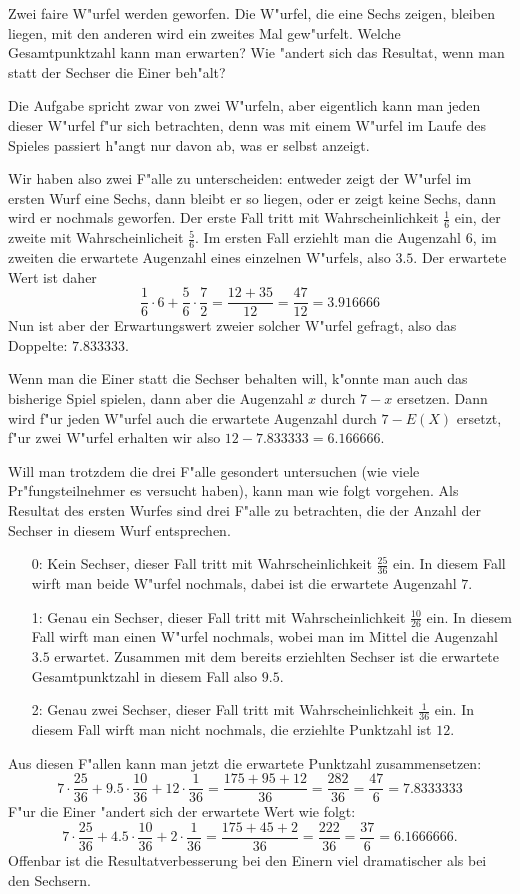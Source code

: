 Zwei faire W"urfel werden geworfen. Die W"urfel, die eine Sechs
zeigen, bleiben liegen, mit den anderen wird ein zweites Mal gew"urfelt.
Welche Gesamtpunktzahl kann man erwarten?
Wie "andert sich das Resultat, wenn man statt der Sechser die Einer
beh"alt?

\begin{loesung}
Die Aufgabe spricht zwar von zwei W"urfeln, aber eigentlich kann man
jeden dieser W"urfel f"ur sich betrachten, denn was mit einem W"urfel
im Laufe des Spieles passiert h"angt nur davon ab, was er selbst
anzeigt.

Wir haben also zwei F"alle zu unterscheiden: entweder zeigt der
W"urfel im ersten Wurf eine Sechs, dann bleibt er so liegen,
oder er zeigt keine Sechs, dann wird er nochmals geworfen.
Der erste Fall tritt mit Wahrscheinlichkeit $\frac16$ ein,
der zweite mit Wahrscheinlicheit $\frac56$. Im ersten Fall
erziehlt man die Augenzahl $6$, im zweiten die erwartete
Augenzahl eines einzelnen W"urfels, also $3.5$. Der erwartete
Wert ist daher
\[
\frac16\cdot 6 +\frac56\cdot\frac72=\frac{12+35}{12}=\frac{47}{12}=3.916666
\]
Nun ist aber der Erwartungswert zweier solcher W"urfel
gefragt, also das Doppelte: $7.833333$.

Wenn man die Einer statt die Sechser behalten will, k"onnte man
auch das bisherige Spiel spielen, dann aber die Augenzahl
$x$ durch $7-x$ ersetzen. Dann wird f"ur jeden W"urfel auch
die erwartete Augenzahl durch $7-E(X)$ ersetzt, f"ur zwei
W"urfel erhalten wir also $12-7.833333 = 6.166666$.

Will man trotzdem die drei F"alle gesondert untersuchen (wie
viele Pr"fungsteilnehmer es versucht haben), kann man wie
folgt vorgehen.
Als Resultat des ersten Wurfes sind drei F"alle zu betrachten, die
der Anzahl der Sechser in diesem Wurf entsprechen.
\begin{itemize}
\item[0:] Kein Sechser, dieser Fall tritt mit Wahrscheinlichkeit
$\frac{25}{36}$ ein.  In diesem Fall wirft man beide W"urfel nochmals,
dabei ist die erwartete Augenzahl $7$.
\item[1:] Genau ein Sechser, dieser Fall tritt mit Wahrscheinlichkeit
$\frac{10}{26}$ ein.  In diesem Fall wirft man einen W"urfel nochmals,
wobei man im Mittel die Augenzahl $3.5$ erwartet.  Zusammen mit dem
bereits erziehlten Sechser ist die erwartete Gesamtpunktzahl in diesem
Fall also $9.5$.
\item[2:] Genau zwei Sechser, dieser Fall tritt mit Wahrscheinlichkeit
$\frac{1}{36}$ ein.  In diesem Fall wirft man nicht nochmals, die
erziehlte Punktzahl ist $12$.
\end{itemize}
Aus diesen F"allen kann man jetzt die erwartete Punktzahl zusammensetzen:
\[
7\cdot \frac{25}{36}
+
9.5\cdot \frac{10}{36}
+
12\cdot\frac{1}{36}
=
\frac{175+95+12}{36}=\frac{282}{36}=\frac{47}{6}
=7.8333333
\]
F"ur die Einer "andert sich der erwartete Wert wie folgt:
\[
7\cdot \frac{25}{36}
+
4.5\cdot \frac{10}{36}
+
2\cdot\frac{1}{36}
=
\frac{175+45+2}{36}=\frac{222}{36}=\frac{37}{6}
=6.1666666.
\]
Offenbar ist die Resultatverbesserung bei den Einern viel dramatischer
als bei den Sechsern.
\end{loesung}

